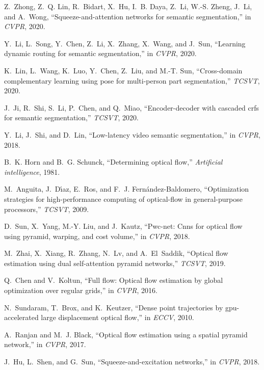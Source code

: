 \documentclass[journal]{IEEEtran}
\begin{document}
\begin{thebibliography}{10}
	Z.~Zhong, Z.~Q. Lin, R.~Bidart, X.~Hu, I.~B. Daya, Z.~Li, W.-S. Zheng, J.~Li,
	and A.~Wong, ``Squeeze-and-attention networks for semantic segmentation,'' in
	\emph{CVPR}, 2020.
	
	Y.~Li, L.~Song, Y.~Chen, Z.~Li, X.~Zhang, X.~Wang, and J.~Sun, ``Learning
	dynamic routing for semantic segmentation,'' in \emph{CVPR}, 2020.
	
	K.~Lin, L.~Wang, K.~Luo, Y.~Chen, Z.~Liu, and M.-T. Sun, ``Cross-domain
	complementary learning using pose for multi-person part segmentation,''
	\emph{TCSVT}, 2020.
	
	J.~Ji, R.~Shi, S.~Li, P.~Chen, and Q.~Miao, ``Encoder-decoder with cascaded
	crfs for semantic segmentation,'' \emph{TCSVT}, 2020.
	
	Y.~Li, J.~Shi, and D.~Lin, ``Low-latency video semantic segmentation,'' in
	\emph{CVPR}, 2018.
	
	B.~K. Horn and B.~G. Schunck, ``Determining optical flow,'' \emph{Artificial
		intelligence}, 1981.
	
	M.~Anguita, J.~D{\'\i}az, E.~Ros, and F.~J. Fern{\'a}ndez-Baldomero,
	``Optimization strategies for high-performance computing of optical-flow in
	general-purpose processors,'' \emph{TCSVT}, 2009.
	
	D.~Sun, X.~Yang, M.-Y. Liu, and J.~Kautz, ``Pwc-net: Cnns for optical flow
	using pyramid, warping, and cost volume,'' in \emph{CVPR}, 2018.
	
	M.~Zhai, X.~Xiang, R.~Zhang, N.~Lv, and A.~El~Saddik, ``Optical flow estimation
	using dual self-attention pyramid networks,'' \emph{TCSVT}, 2019.
	
	Q.~Chen and V.~Koltun, ``Full flow: Optical flow estimation by global
	optimization over regular grids,'' in \emph{CVPR}, 2016.
	
	N.~Sundaram, T.~Brox, and K.~Keutzer, ``Dense point trajectories by
	gpu-accelerated large displacement optical flow,'' in \emph{ECCV}, 2010.
	
	A.~Ranjan and M.~J. Black, ``Optical flow estimation using a spatial pyramid
	network,'' in \emph{CVPR}, 2017.
	
	J.~Hu, L.~Shen, and G.~Sun, ``Squeeze-and-excitation networks,'' in
	\emph{CVPR}, 2018.
	

\end{thebibliography}
\end{document}

